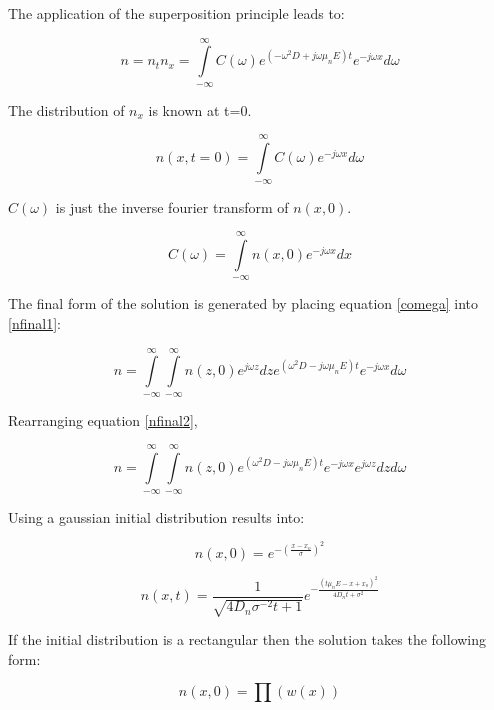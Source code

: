 \begin{doublespace}
The application of the superposition principle leads to:

\begin{equation}
n=n_tn_x=\int\limits_{-\infty}^{\infty}C(\omega)e^{(-\omega^2 D + j\omega \mu_n E)t} e^{-j\omega x}d\omega
\label{nfinal1}
\end{equation}

The distribution of $n_x$ is known at t=0.

\begin{equation}
n(x,t=0)=\int\limits_{-\infty}^{\infty}C(\omega) e^{-j\omega x}d\omega
\end{equation}

$C(\omega)$ is just the inverse fourier transform of $n(x,0)$.

\begin{equation}
C(\omega)=\int\limits_{-\infty}^{\infty}n(x,0)e^{-j\omega x}dx
\label{comega}
\end{equation}

The final form of the solution is generated by placing equation \eqref{comega} into \eqref{nfinal1}:

\begin{equation}
n=\int\limits_{-\infty}^{\infty}\int\limits_{-\infty}^{\infty}n(z,0)e^{j\omega z}dz e^{(\omega ^2 D-j\omega \mu_n E)t}e^{-j\omega x}d\omega
\label{nfinal2}
\end{equation}

Rearranging equation \eqref{nfinal2},

\begin{equation}
n=\int\limits_{-\infty}^{\infty}\int\limits_{-\infty}^{\infty}n(z,0) e^{(\omega ^2 D-j\omega \mu_n E)t}e^{-j\omega x} e^{j\omega z}  dz d\omega
\end{equation}

Using a gaussian initial distribution results into:

\begin{equation}
n(x,0)=e^{- (\frac{x-x_o}{\sigma})^2}
\end{equation}

\begin{equation}
n(x,t)=\frac{1}{\sqrt{4D_n\sigma^{-2}t+1}}e^{-\frac{(t\mu_n E-x+x_o)^2}{4D_n t+\sigma^2}}
\end{equation}

If the initial distribution is a rectangular then the solution takes the following form:

\begin{equation}
n(x,0)=\prod (w(x))
\end{equation}


\end{doublespace}
